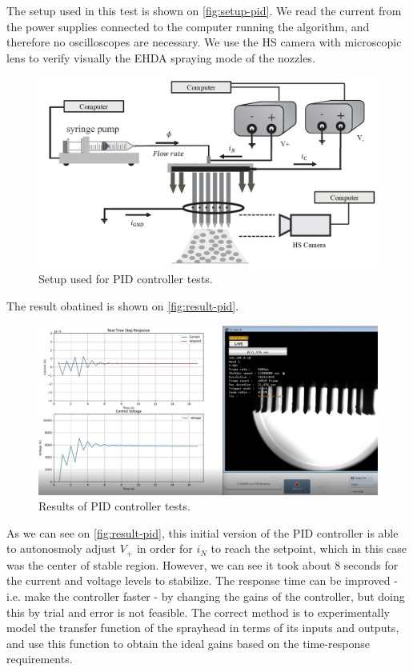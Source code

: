 \documentclass[oneside,12pt]{article}
\begin{document}
The setup used in this test is shown on \autoref{fig:setup-pid}. We read the current from the power supplies connected 
to the computer running the algorithm, and therefore no oscilloscopes are necessary. We use the HS camera with microscopic lens to verify 
visually the EHDA spraying mode of the nozzles.

\begin{figure}[h!]
    \centering
    \includegraphics[width=\textwidth,trim=1 1 1 1,clip]{figures/setup-pid.png}
    \caption{Setup used for PID controller tests.}
    \label{fig:setup-pid}
\end{figure}

The result obatined is shown on \autoref{fig:result-pid}.

\begin{figure}[h!]
    \centering
    \includegraphics[width=\textwidth,trim=1 1 1 1,clip]{figures/result-pid.png}
    \caption{Results of PID controller tests.}
    \label{fig:result-pid}
\end{figure}

As we can see on \autoref{fig:result-pid}, this initial version of the PID controller is able to autonosmoly adjust $V_+$ in order
for $i_N$ to reach the setpoint, which in this case was the center of stable region.
However, we can see it took about 8 seconds for the current and voltage levels to stabilize.
The response time can be improved - i.e. make the controller faster - by changing the gains of the controller, 
but doing this by trial and
error is not feasible. The correct method is to experimentally model the transfer function of the sprayhead in terms 
of its inputs and outputs, and use this function to obtain the ideal gains based on the time-response requirements. 
\end{document}
